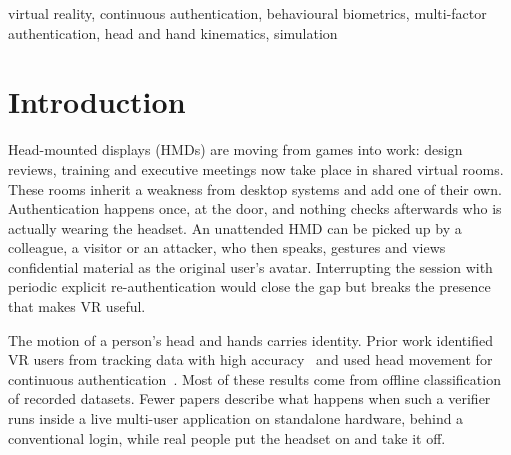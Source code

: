 \begin{IEEEkeywords}
virtual reality, continuous authentication, behavioural biometrics, multi-factor authentication, head and hand kinematics, simulation
\end{IEEEkeywords}

\section{Introduction}
Head-mounted displays (HMDs) are moving from games into work: design reviews, training and executive meetings now take place in shared virtual rooms. These rooms inherit a weakness from desktop systems and add one of their own. Authentication happens once, at the door, and nothing checks afterwards who is actually wearing the headset. An unattended HMD can be picked up by a colleague, a visitor or an attacker, who then speaks, gestures and views confidential material as the original user's avatar. Interrupting the session with periodic explicit re-authentication would close the gap but breaks the presence that makes VR useful.

The motion of a person's head and hands carries identity. Prior work identified VR users from tracking data with high accuracy~\cite{pfeuffer2019,miller2020,nair2023} and used head movement for continuous authentication~\cite{mustafa2018,gyreyiri2025}. Most of these results come from offline classification of recorded datasets. Fewer papers describe what happens when such a verifier runs inside a live multi-user application on standalone hardware, behind a conventional login, while real people put the headset on and take it off.

